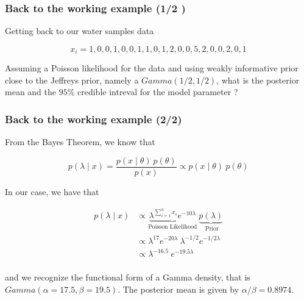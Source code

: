 \documentclass[border=5mm, convert, usenames, dvipsnames,beamer]{standalone}
\begin{document}
\begin{frame}[ fragile]{}
\frametitle{Back to the working example (1/2
)}

\vspace{30}
\noindent
Getting back to our water samples data

$$
x_{i} = 1, 0, 0, 1, 0, 0, 1, 1, 0, 1, 2, 0, 0, 5, 2, 0, 0, 2, 0, 1
$$

\vspace{10}
\noindent
Assuming a Poisson likelihood for the data and using weakly informative prior close to the Jeffreys  prior, namely a $Gamma(1/2, 1/2)$, what is the posterior mean and the $95 \%$ credible intreval for the model parameter ?

\par
\end{frame}







\begin{frame}[ fragile]{}
\frametitle{Back to the working example (2/2)}

\vspace{40}
\noindent
From the Bayes Theorem, we know that 

$$
p( \lambda   \mid x  ) = \frac{p(x \mid \theta) \  p(\theta)}{ p(x) }  \propto  p( x   \mid \theta) \  p(\theta) 
$$

\vspace{5}
\noindent
In our case, we have that

$$
\begin{align*}
p( \lambda   \mid x  ) & \propto  \underbrace{ \lambda^{\sum_{i=1}^{n}x_{i}} e^{-10\lambda}}_{\text{Poisson  Likelihood}} \    \underbrace{ p(\lambda)}_{\text{ Prior}} \\
& \propto   \lambda^{17} e^{-20\lambda} \  \lambda^{ -1/2 }   e^{- 1/2 \lambda  } \\
& \propto   \lambda^{-16.5} \    e^{-  19.5 \lambda  } \\
\end{align} 
$$

\vspace{5}
\noindent
and we recognize the functional form of a Gamma density, that is $Gamma(\alpha = 17.5, \beta = 19.5)$. The posterior mean is given by $\alpha / \beta = 0.8974$.


\par
\end{frame}
\end{document}
